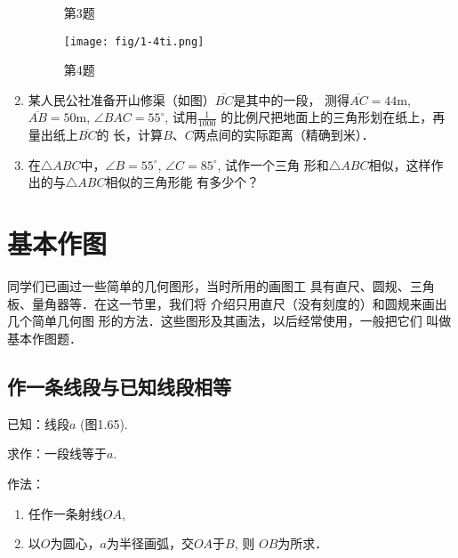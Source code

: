 \begin{enumerate}
\begin{figure}[htp]
\begin{minipage}[t]{0.48\textwidth}
    \caption*{第3题}
    \end{minipage}
    \begin{minipage}[t]{0.48\textwidth}
    \centering
\texttt{[image: fig/1-4ti.png]}
    \caption*{第4题}
    \end{minipage}
    \end{figure}

\item 某人民公社准备开山修渠（如图）$\overline{BC}$是其中的一段，
测得$\overline{AC}=44$m, $\overline{AB}=50$m, $\angle BAC=55^{\circ}$, 试用$\frac{1}{1000}$
的比例尺把地面上的三角形划在纸上，再量出纸上$\overline{BC}$的
长，计算$B$、$C$两点间的实际距离（精确到米）．

\item 在$\triangle ABC$中，$\angle B=55^{\circ}$, $\angle C=85^{\circ}$, 试作一个三角
形和$\triangle ABC$相似，这样作出的与$\triangle ABC$相似的三角形能
有多少个？
\end{enumerate}

\section{基本作图}
同学们已画过一些简单的几何图形，当时所用的画图工
具有直尺、圆规、三角板、量角器等．在这一节里，我们将
介绍只用直尺（没有刻度的）和圆规来画出几个简单几何图
形的方法．这些图形及其画法，以后经常使用，一般把它们
叫做基本作图题．

\subsection{作一条线段与已知线段相等}
已知：线段$a$ (图1.65).

求作：一段线等于$a$.
\begin{figure}[htp]
	\centering
{}
	\caption{}
\end{figure}


作法：
\begin{enumerate}
\item 任作一条射线$OA$,
\item 以$O$为圆心，$a$为半径画弧，交$OA$于$B$, 则
$OB$为所求．
\end{enumerate}




